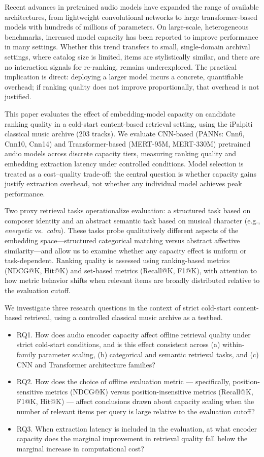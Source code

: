 \documentclass[sigconf]{acmart}
\begin{document}
Recent advances in pretrained audio models have expanded the range of available architectures, from lightweight convolutional networks to large transformer-based models with hundreds of millions of parameters. On large-scale, heterogeneous benchmarks, increased model capacity has been reported to improve performance in many settings. Whether this trend transfers to small, single-domain archival settings, where catalog size is limited, items are stylistically similar, and there are no interaction signals for re-ranking, remains underexplored. The practical implication is direct: deploying a larger model incurs a concrete, quantifiable overhead; if ranking quality does not improve proportionally, that overhead is not justified.

This paper evaluates the effect of embedding-model capacity on candidate ranking quality in a cold-start content-based retrieval setting, using the iPalpiti classical music archive (203 tracks). We evaluate CNN-based (PANNs: Cnn6, Cnn10, Cnn14) and Transformer-based (MERT-95M, MERT-330M) pretrained audio models across discrete capacity tiers, measuring ranking quality and embedding extraction latency under controlled conditions. Model selection is treated as a cost--quality trade-off: the central question is whether capacity gains justify extraction overhead, not whether any individual model achieves peak performance.

Two proxy retrieval tasks operationalize evaluation: a structured task based on composer identity and an abstract semantic task based on musical character (e.g., \emph{energetic} vs.\ \emph{calm}). These tasks probe qualitatively different aspects of the embedding space---structured categorical matching versus abstract affective similarity---and allow us to examine whether any capacity effect is uniform or task-dependent. Ranking quality is assessed using ranking-based metrics (NDCG@K, Hit@K) and set-based metrics (Recall@K, F1@K), with attention to how metric behavior shifts when relevant items are broadly distributed relative to the evaluation cutoff.

We investigate three research questions in the context of strict cold-start content-based retrieval, using a controlled classical music archive as a testbed.
\begin{itemize}
    \item RQ1. How does audio encoder capacity affect offline retrieval quality under strict cold-start conditions, and is this effect consistent across (a) within-family parameter scaling, (b) categorical and semantic retrieval tasks, and (c) CNN and Transformer architecture families?
    \item RQ2. How does the choice of offline evaluation metric — specifically, position-sensitive metrics (NDCG@K) versus position-insensitive metrics (Recall@K, F1@K, Hit@K) — affect conclusions drawn about capacity scaling when the number of relevant items per query is large relative to the evaluation cutoff?
    \item RQ3. When extraction latency is included in the evaluation, at what encoder capacity does the marginal improvement in retrieval quality fall below the marginal increase in computational cost?
\end{itemize}
\end{document}
